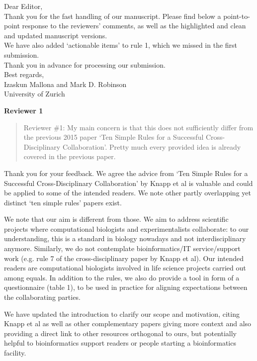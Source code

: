 \documentclass[a4paper]{article}
\begin{document}
\noindent Dear Editor,\\

Thank you for the fast handling of our manuscript. Please find below a point-to-point response to the reviewers' comments, as well as the highlighted and clean and updated manuscript versions.\\

We have also added `actionable items' to rule 1, which we missed in the first submission.\\

Thank you in advance for processing our submission. \\

Best regards,\\

\noindent Izaskun Mallona and Mark D. Robinson \\
\noindent University of Zurich

\vspace{1cm}

\noindent \textbf{Reviewer 1}

\begin{quote}
    Reviewer \#1: My main concern is that this does not sufficiently differ from the previous 2015 paper `Ten Simple Rules for a Successful Cross-Disciplinary Collaboration'. Pretty much every provided idea is already covered in the previous paper.

\end{quote}

Thank you for your feedback. We agree the advice from `Ten Simple Rules for a Successful Cross-Disciplinary Collaboration' by Knapp et al is valuable and could be applied to some of the intended readers. We note other partly overlapping yet distinct `ten simple rules' papers exist.

We note that our aim is different from those. We aim to address scientific projects where computational biologists and experimentalists collaborate: to our understanding, this is a standard in biology nowadays and not interdisciplinary anymore. Similarly, we do not contemplate bioinformatics/IT service/support work (e.g. rule 7 of the cross-disciplinary paper by Knapp et al). Our intended readers are computational biologists involved in life science projects carried out among equals. 
In addition to the rules, we also do provide a tool in form of a questionnaire (table 1), to be used in practice for aligning expectations between the collaborating parties.

We have updated the introduction to clarify our scope and motivation, citing Knapp et al as well as other complementary papers giving more context and also providing a direct link to other resources orthogonal to ours, but potentially helpful to bioinformatics support readers or people starting a bioinformatics facility.\\
\end{document}
